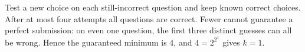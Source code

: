 Test a new choice on each still-incorrect question and keep known correct choices. After at most four attempts all questions are correct. Fewer cannot guarantee a perfect submission: on even one question, the first three distinct guesses can all be wrong. Hence the guaranteed minimum is 4, and $4=2^{2^1}$ gives $\boxed{k=1}$.
